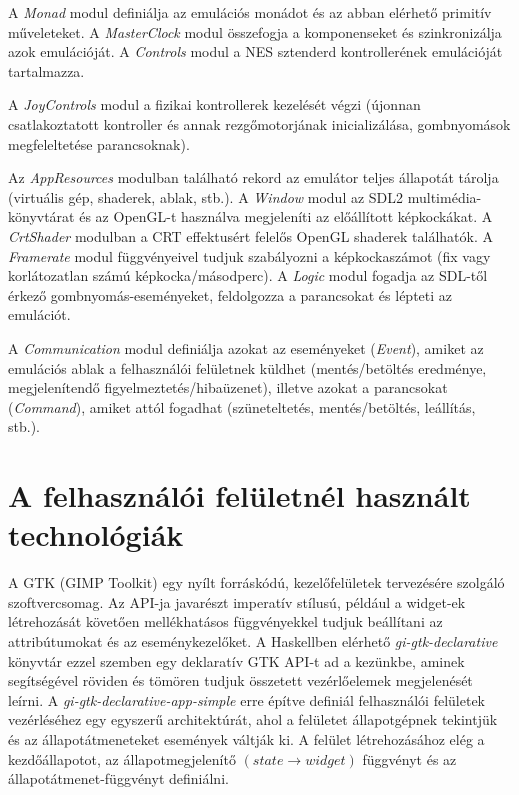 A \emph{Monad} modul definiálja az emulációs monádot és az abban elérhető primitív műveleteket.
A \emph{MasterClock} modul összefogja a komponenseket és szinkronizálja azok emulációját.
A \emph{Controls} modul a NES sztenderd kontrollerének emulációját tartalmazza.   

A \emph{JoyControls} modul a fizikai kontrollerek kezelését végzi (újonnan csatlakoztatott kontroller és annak rezgőmotorjának inicializálása, gombnyomások megfeleltetése parancsoknak).

Az \emph{AppResources} modulban található rekord az emulátor teljes állapotát tárolja (virtuális gép, shaderek, ablak, stb.).
A \emph{Window} modul az SDL2 multimédia-könyvtárat és az OpenGL-t használva megjeleníti az előállított képkockákat. A \emph{CrtShader} modulban a CRT effektusért felelős OpenGL shaderek találhatók. A \emph{Framerate} modul függvényeivel tudjuk szabályozni a képkockaszámot (fix vagy korlátozatlan számú képkocka/másodperc). A \emph{Logic} modul fogadja az SDL-től érkező gombnyomás-eseményeket, feldolgozza a parancsokat és lépteti az emulációt.

A \emph{Communication} modul definiálja azokat az eseményeket (\emph{Event}), amiket az emulációs ablak a felhasználói felületnek küldhet (mentés/betöltés eredménye, megjelenítendő figyelmeztetés/hibaüzenet), illetve azokat a parancsokat (\emph{Command}), amiket attól fogadhat (szüneteltetés, mentés/betöltés, leállítás, stb.).

\section{A felhasználói felületnél használt technológiák}

A GTK (GIMP Toolkit) egy nyílt forráskódú, kezelőfelületek tervezésére szolgáló szoftvercsomag.
Az API-ja javarészt imperatív stílusú, például a widget-ek létrehozását követően mellékhatásos függvényekkel tudjuk beállítani az attribútumokat és az eseménykezelőket. A Haskellben elérhető \emph{gi-gtk-declarative} könyvtár ezzel szemben egy deklaratív GTK API-t ad a kezünkbe, aminek segítségével röviden és tömören tudjuk összetett vezérlőelemek megjelenését leírni. 
A \emph{gi-gtk-declarative-app-simple} erre építve definiál felhasználói felületek vezérléséhez egy egyszerű architektúrát, ahol a felületet állapotgépnek tekintjük és az állapotátmeneteket események váltják ki. A felület létrehozásához elég a kezdőállapotot, az állapotmegjelenítő $(state \rightarrow widget)$ függvényt és az állapotátmenet-függvényt definiálni.

